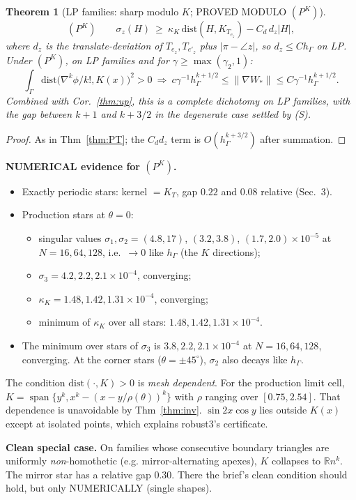 \documentclass[11pt]{article}
\newtheorem{theorem}{Theorem}[section]
\theoremstyle{remark}
\newcommand{\hG}{h_\Gamma}
\begin{document}
\begin{theorem}[LP families: sharp modulo $K$; PROVED MODULO $(P^K)$]\label{thm:PK}
\[
(P^K)\qquad\sigma_z(H)\ \ge\ \kappa_K\,\mathrm{dist}(H,K_{T_{e_z}})-C_d\,d_z|H|,
\]
where $d_z$ is the translate-deviation of $T_{e_z},T_{e'_z}$ plus $|\pi-\angle z|$, so $d_z\le C\hG$ on LP. Under $(P^K)$, on
LP families and for $\gamma\ge\max(\gamma_2,1)$:
\[
\int_\Gamma\mathrm{dist}\big(\nabla^k\phi/k!,K(x)\big)^2>0\ \Longrightarrow\ c\gamma^{-1}\hG^{k+1/2}\le\|\nabla W_\ast\|\le
C\gamma^{-1}\hG^{k+1/2}.
\]
Combined with Cor.~\ref{thm:up}, this is a complete dichotomy on LP families, with the gap between $k+1$ and $k+3/2$ in the
degenerate case settled by (S).
\end{theorem}
\begin{proof}
As in Thm~\ref{thm:PT}; the $C_dd_z$ term is $O(\hG^{k+3/2})$ after summation.
\end{proof}
\noindent\textbf{NUMERICAL evidence for $(P^K)$.}
\begin{itemize}
\item Exactly periodic stars: kernel $=K_T$, gap $0.22$ and $0.08$ relative (Sec.~3).
\item Production stars at $\theta=0$:
 \begin{itemize}
 \item singular values $\sigma_1,\sigma_2=(4.8,17)$, $(3.2,3.8)$, $(1.7,2.0)\times10^{-5}$ at $N=16,64,128$, i.e.\ $\to0$
 like $\hG$ (the $K$ directions);
 \item $\sigma_3=4.2,2.2,2.1\times10^{-4}$, converging;
 \item $\kappa_K=1.48,1.42,1.31\times10^{-4}$, converging;
 \item minimum of $\kappa_K$ over all stars: $1.48,1.42,1.31\times10^{-4}$.
 \end{itemize}
\item The minimum over stars of $\sigma_3$ is $3.8,2.2,2.1\times10^{-4}$ at $N=16,64,128$, converging. At the corner
stars ($\theta=\pm45^\circ$), $\sigma_2$ also decays like $\hG$.
\end{itemize}
The condition $\mathrm{dist}(\cdot,K)>0$ is \emph{mesh dependent}. For the production limit cell,
$K=\operatorname{span}\{y^k,x^k-(x-y/\rho(\theta))^k\}$ with $\rho$ ranging over $[0.75,2.54]$. That dependence is unavoidable by
Thm~\ref{thm:inv}. $\sin2x\cos y$ lies outside $K(x)$ except at isolated points, which explains robust3's certificate.

\noindent\textbf{Clean special case.} On families whose consecutive boundary triangles are uniformly \emph{non}-homothetic (e.g.
mirror-alternating apexes), $K$ collapses to $\mathbb Rn^k$. The mirror star has a relative gap $0.30$. There the brief's clean
condition should hold, but only NUMERICALLY (single shapes).
\end{document}
